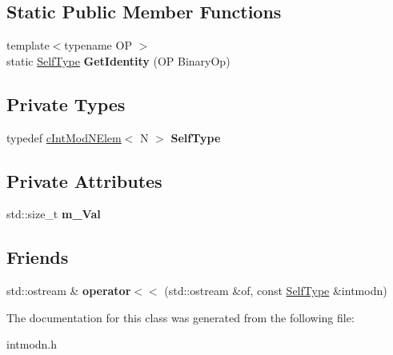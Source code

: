 \subsection*{Static Public Member Functions}
\begin{DoxyCompactItemize}
\item 
\hypertarget{classcIntModNElem_a5130425382c5a5bdfd28f3b7742a4878}{{\footnotesize template$<$typename O\-P $>$ }\\static \hyperlink{classcIntModNElem}{Self\-Type} {\bfseries Get\-Identity} (O\-P Binary\-Op)}\label{classcIntModNElem_a5130425382c5a5bdfd28f3b7742a4878}

\end{DoxyCompactItemize}
\subsection*{Private Types}
\begin{DoxyCompactItemize}
\item 
\hypertarget{classcIntModNElem_ae78e9df5cc365eb679d0007191f86424}{typedef \hyperlink{classcIntModNElem}{c\-Int\-Mod\-N\-Elem}$<$ N $>$ {\bfseries Self\-Type}}\label{classcIntModNElem_ae78e9df5cc365eb679d0007191f86424}

\end{DoxyCompactItemize}
\subsection*{Private Attributes}
\begin{DoxyCompactItemize}
\item 
\hypertarget{classcIntModNElem_abaf8f2803c5a508b807c7e142da41b51}{std\-::size\-\_\-t {\bfseries m\-\_\-\-Val}}\label{classcIntModNElem_abaf8f2803c5a508b807c7e142da41b51}

\end{DoxyCompactItemize}
\subsection*{Friends}
\begin{DoxyCompactItemize}
\item 
\hypertarget{classcIntModNElem_ac999b0fda4f712c41d0a8f38c4584a8d}{std\-::ostream \& {\bfseries operator$<$$<$} (std\-::ostream \&of, const \hyperlink{classcIntModNElem}{Self\-Type} \&intmodn)}\label{classcIntModNElem_ac999b0fda4f712c41d0a8f38c4584a8d}

\end{DoxyCompactItemize}


The documentation for this class was generated from the following file\-:\begin{DoxyCompactItemize}
\item 
intmodn.\-h\end{DoxyCompactItemize}

